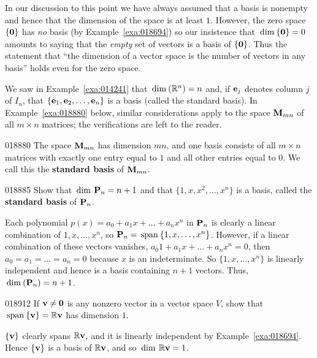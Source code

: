 \noindent In our discussion to this point we have always assumed that a basis is nonempty and hence that the dimension of the space is at least $1$. However, the zero space $\{\textbf{0}\}$ has \textit{no} basis (by Example~\ref{exa:018694}) so our insistence that $\thinspace\operatorname{dim\medspace}\{\textbf{0}\} = 0$ amounts to saying that the \textit{empty} set of vectors is a basis of $\{\textbf{0}\}$. Thus the statement that ``the dimension of a vector space is the number of vectors in any basis'' holds even for the zero space.

We saw in Example~\ref{exa:014241} that $\thinspace\operatorname{dim\medspace}(\mathbb{R}^n) = n$ and, if $\textbf{e}_{j}$ denotes column $j$ of $I_{n}$, that $\{\textbf{e}_{1}, \textbf{e}_{2}, \dots, \textbf{e}_{n}\}$ is a basis (called the standard basis). In Example~\ref{exa:018880} below, similar considerations apply to the space $\textbf{M}_{mn}$ of all $m \times n$ matrices; the verifications are left to the reader.

\begin{example}{}{018880}
The space $\textbf{M}_{mn}$ has dimension $mn$, and one basis consists of all $m \times n$ matrices with exactly one entry equal to $1$ and all other entries equal to $0$. We call this the \textbf{standard basis} of $\textbf{M}_{mn}$.
\end{example}

\begin{example}{}{018885}
Show that $\thinspace\operatorname{dim\medspace} \textbf{P}_{n} = n + 1$ and that $\{1, x, x^{2}, \dots, x^{n}\}$ is a basis, called the \textbf{standard basis} of $\textbf{P}_{n}$.

\begin{solution}
Each polynomial $p(x) = a_{0} + a_{1}x + \dots + a_{n}x^{n}$ in $\textbf{P}_{n}$ is clearly a linear combination of $1, x, \dots, x^{n}$, so $\textbf{P}_{n} = \thinspace\operatorname{span\medspace}\{1, x, \dots, x^{n}\}$. However, if a linear combination of these vectors vanishes, $a_{0}1 + a_{1}x + \dots + a_{n}x^{n} = 0$, then $a_{0} = a_{1} = \dots = a_{n} = 0$ because $x$ is an indeterminate. So $\{1, x, \dots, x^{n}\}$ is linearly independent and hence is a basis containing $n + 1$ vectors. Thus, $\thinspace\operatorname{dim\medspace}(\textbf{P}_{n}) = n + 1$.
\end{solution}
\end{example}

\begin{example}{}{018912}
If $\textbf{v} \neq \textbf{0}$ is any nonzero vector in a vector space $V$, show that $\thinspace\operatorname{span\medspace}\{\textbf{v}\} = \mathbb{R}\textbf{v}$ has dimension $1$.

\begin{solution}
$\{\textbf{v}\}$ clearly spans $\mathbb{R}\textbf{v}$, and it is linearly independent by Example~\ref{exa:018694}. Hence $\{\textbf{v}\}$ is a basis of $\mathbb{R}\textbf{v}$, and so $\thinspace\operatorname{dim\medspace} \mathbb{R}\textbf{v} = 1$.
\end{solution}
\end{example}

